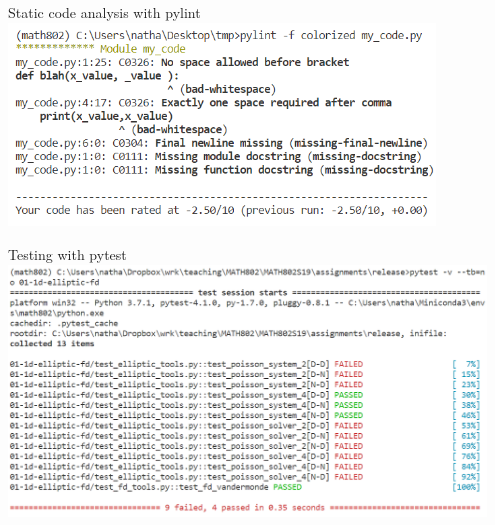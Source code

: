 \documentclass{beamer}
\begin{document}
\begin{frame}{Static code analysis with pylint}
\includegraphics[width=0.85\textwidth]{images/pylint.png}
\end{frame}

\begin{frame}{Testing with pytest}
\includegraphics[width=0.95\textwidth]{images/pytest.png}
\end{frame}
\end{document}
